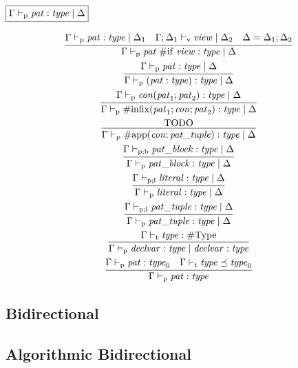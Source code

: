 $\fbox{$\Gamma \vdash_\mathrm{p} \mathit{pat}: \mathit{type} \mid \Delta$}$

\begin{gather*}
    \infer{\Gamma \vdash_\mathrm{p} \mathit{pat}\; \mathrm{\#if}\; \mathit{view}: \mathit{type} \mid \Delta}{
        \Gamma \vdash_\mathrm{p} \mathit{pat}: \mathit{type} \mid \Delta_1
        &
        \Gamma; \Delta_1 \vdash_\mathrm{v} \mathit{view} \mid \Delta_2
        &
        \Delta = \Delta_1; \Delta_2
    }
    \\
    \infer{\Gamma \vdash_\mathrm{p} (\mathit{pat}: \mathit{type}): \mathit{type} \mid \Delta}{
        \Gamma \vdash_\mathrm{p} \mathit{pat}: \mathit{type} \mid \Delta
    }
    \\
    \infer{\Gamma \vdash_\mathrm{p} \mathrm{\#infix}(\mathit{pat}_1; \mathit{con}; \mathit{pat}_2): \mathit{type} \mid \Delta}{
        \Gamma \vdash_\mathrm{p} \mathit{con}(\mathit{pat}_1; \mathit{pat}_2): \mathit{type} \mid \Delta
    }
    \\
    \infer{\Gamma \vdash_\mathrm{p} \mathrm{\#app}(\mathit{con}; \mathit{pat\_tuple}): \mathit{type} \mid \Delta}{
        \text{TODO}
    }
    \\
    \infer{\Gamma \vdash_\mathrm{p} \mathit{pat\_block}: \mathit{type} \mid \Delta}{
        \Gamma \vdash_{\mathrm{p}; \mathrm{b}} \mathit{pat\_block}: \mathit{type} \mid \Delta
    }
    \\
    \infer{\Gamma \vdash_\mathrm{p} \mathit{literal}: \mathit{type} \mid \Delta}{
        \Gamma \vdash_{\mathrm{p}; \mathrm{l}} \mathit{literal}: \mathit{type} \mid \Delta
    }
    \\
    \infer{\Gamma \vdash_\mathrm{p} \mathit{pat\_tuple}: \mathit{type} \mid \Delta}{
        \Gamma \vdash_{\mathrm{p}; \mathrm{l}} \mathit{pat\_tuple}: \mathit{type} \mid \Delta
    }
    \\
    \infer{\Gamma \vdash_\mathrm{p} \mathit{declvar}: \mathit{type} \mid \mathit{declvar}: \mathit{type}}{
        \Gamma \vdash_\mathrm{t} \mathit{type}: \mathrm{\#Type}
    }
    \\
    \infer{\Gamma \vdash_\mathrm{p} \mathit{pat}: \mathit{type}}{
        \Gamma \vdash_\mathrm{p} \mathit{pat}: \mathit{type}_0
        &
        \Gamma \vdash_\mathrm{t} \mathit{type} \preceq \mathit{type}_0
    }
\end{gather*}

\subsection{Bidirectional}

\subsection{Algorithmic Bidirectional}
